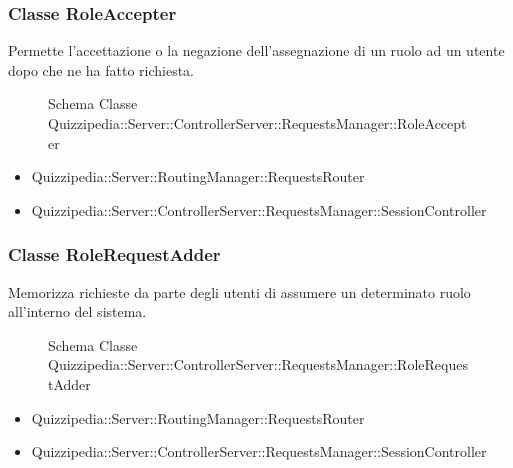 \subsubsection{Classe RoleAccepter}
Permette l'accettazione o la negazione dell'assegnazione di un ruolo ad un utente dopo che ne ha fatto richiesta.
\begin{figure}[H]
\centering
\noindent{}
\caption[Schema Classe RoleAccepter]{Schema Classe Quizzipedia::Server::ControllerServer::RequestsManager::RoleAccepter}
\end{figure}
\begin{itemize}
\item Quizzipedia::Server::RoutingManager::RequestsRouter
\end{itemize}
\begin{itemize}
\item Quizzipedia::Server::ControllerServer::RequestsManager::SessionController
\end{itemize}
\subsubsection{Classe RoleRequestAdder}
Memorizza richieste da parte degli utenti di assumere un determinato ruolo all'interno del sistema.
\begin{figure}[H]
\centering
\noindent{}
\caption[Schema Classe RoleRequestAdder]{Schema Classe Quizzipedia::Server::ControllerServer::RequestsManager::RoleRequestAdder}
\end{figure}
\begin{itemize}
\item Quizzipedia::Server::RoutingManager::RequestsRouter
\end{itemize}
\begin{itemize}
\item Quizzipedia::Server::ControllerServer::RequestsManager::SessionController
\end{itemize}
